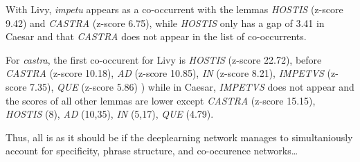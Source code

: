 With Livy, \textit{impetu} appears as a co-occurrent with the lemmas \textit{HOSTIS} (z-score 9.42) and \textit{CASTRA} (z-score 6.75), while \textit{HOSTIS} only has a gap of 3.41 in Caesar and that \textit{CASTRA} does not appear in the list of co-occurrents.

For \textit{castra}, the first co-occurent for Livy is \textit{HOSTIS} (z-score 22.72), before \textit{CASTRA} (z-score 10.18), \textit{AD} (z-score 10.85), \textit{IN} (z-score 8.21), \textit{IMPETVS} (z-score 7.35), \textit{QUE} (z-score 5.86) ) while in Caesar, \textit{IMPETVS} does not appear and the scores of all other lemmas are lower except \textit{CASTRA} (z-score 15.15), \textit{HOSTIS} (8),  \textit{AD} (10,35), \textit{IN} (5,17), \textit{QUE} (4.79).

Thus, all is as it should be if the deeplearning network manages to simultaniously account for specificity, phrase structure, and co-occurence networks\ldots


